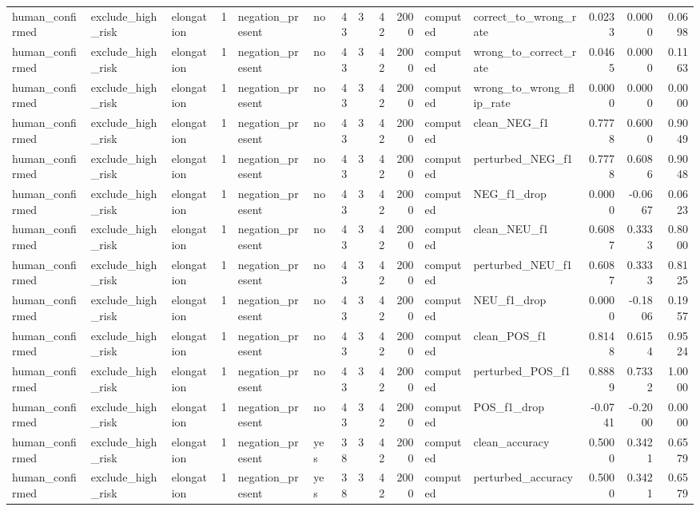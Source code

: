 \begin{tabular}{lllrllrrrrllrrr}
human_confirmed & exclude_high_risk & elongation & 1 & negation_present & no & 43 & 3 & 42 & 2000 & computed & correct_to_wrong_rate & 0.0233 & 0.0000 & 0.0698 \\
human_confirmed & exclude_high_risk & elongation & 1 & negation_present & no & 43 & 3 & 42 & 2000 & computed & wrong_to_correct_rate & 0.0465 & 0.0000 & 0.1163 \\
human_confirmed & exclude_high_risk & elongation & 1 & negation_present & no & 43 & 3 & 42 & 2000 & computed & wrong_to_wrong_flip_rate & 0.0000 & 0.0000 & 0.0000 \\
human_confirmed & exclude_high_risk & elongation & 1 & negation_present & no & 43 & 3 & 42 & 2000 & computed & clean_NEG_f1 & 0.7778 & 0.6000 & 0.9049 \\
human_confirmed & exclude_high_risk & elongation & 1 & negation_present & no & 43 & 3 & 42 & 2000 & computed & perturbed_NEG_f1 & 0.7778 & 0.6086 & 0.9048 \\
human_confirmed & exclude_high_risk & elongation & 1 & negation_present & no & 43 & 3 & 42 & 2000 & computed & NEG_f1_drop & 0.0000 & -0.0667 & 0.0623 \\
human_confirmed & exclude_high_risk & elongation & 1 & negation_present & no & 43 & 3 & 42 & 2000 & computed & clean_NEU_f1 & 0.6087 & 0.3333 & 0.8000 \\
human_confirmed & exclude_high_risk & elongation & 1 & negation_present & no & 43 & 3 & 42 & 2000 & computed & perturbed_NEU_f1 & 0.6087 & 0.3333 & 0.8125 \\
human_confirmed & exclude_high_risk & elongation & 1 & negation_present & no & 43 & 3 & 42 & 2000 & computed & NEU_f1_drop & 0.0000 & -0.1806 & 0.1957 \\
human_confirmed & exclude_high_risk & elongation & 1 & negation_present & no & 43 & 3 & 42 & 2000 & computed & clean_POS_f1 & 0.8148 & 0.6154 & 0.9524 \\
human_confirmed & exclude_high_risk & elongation & 1 & negation_present & no & 43 & 3 & 42 & 2000 & computed & perturbed_POS_f1 & 0.8889 & 0.7332 & 1.0000 \\
human_confirmed & exclude_high_risk & elongation & 1 & negation_present & no & 43 & 3 & 42 & 2000 & computed & POS_f1_drop & -0.0741 & -0.2000 & 0.0000 \\
human_confirmed & exclude_high_risk & elongation & 1 & negation_present & yes & 38 & 3 & 42 & 2000 & computed & clean_accuracy & 0.5000 & 0.3421 & 0.6579 \\
human_confirmed & exclude_high_risk & elongation & 1 & negation_present & yes & 38 & 3 & 42 & 2000 & computed & perturbed_accuracy & 0.5000 & 0.3421 & 0.6579 \\

\end{tabular}
